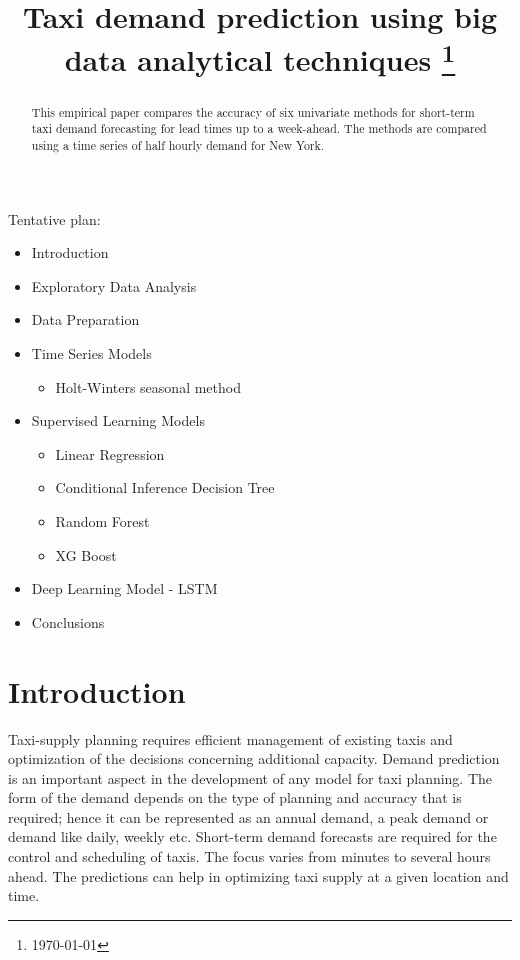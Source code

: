\documentclass[10pt, reqno]{amsart}
\title[Taxi demand forecast]{{Taxi demand prediction using big data analytical techniques} \footnote{\hfill \today}}
\begin{document}
\maketitle

\vspace{0.5cm}

\begin{abstract}
This empirical paper compares the accuracy of six univariate methods for short-term taxi demand forecasting for lead times up to a week-ahead. The methods are compared using a time series of half hourly demand for New York.
\end{abstract}

Tentative plan:
\begin{itemize}
\item Introduction
\item Exploratory Data Analysis
\item Data Preparation
\item Time Series Models
\begin{itemize}
\item Holt-Winters seasonal method
\end{itemize}
\item Supervised Learning Models
\begin{itemize}
\item Linear Regression
\item Conditional Inference Decision Tree
\item Random Forest
\item XG Boost
\end{itemize}
\item Deep Learning Model - LSTM
\item Conclusions 
\end{itemize}

\section{Introduction}

Taxi-supply planning requires efficient management of existing taxis and optimization of the decisions concerning additional capacity. Demand prediction is an important aspect in the development of any model for taxi planning. The form of the demand depends on the type of planning and accuracy that is required; hence it can be represented as an annual demand, a peak demand or demand like daily, weekly etc. Short-term demand forecasts are required for the control and scheduling of taxis. The focus varies from minutes to several hours ahead. The predictions can help in optimizing taxi supply at a given location and time. 
\end{document}
